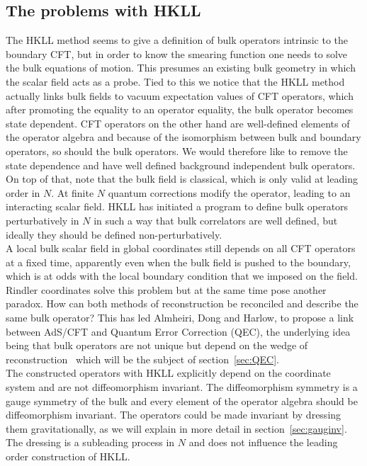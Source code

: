 \documentclass{PoS}
\begin{document}
\subsection{The problems with HKLL}
The HKLL method seems to give a definition of bulk operators intrinsic to the boundary CFT, but in order to know the smearing function one needs to solve the bulk equations of motion. This presumes an existing bulk geometry in which the scalar field acts as a probe. Tied to this we notice that the HKLL method actually links bulk fields to vacuum expectation values of CFT operators, which after promoting the equality to an operator equality, the bulk operator becomes state dependent.  CFT operators on the other hand are well-defined elements of the operator algebra and because of the isomorphism between bulk and boundary operators, so should the bulk operators. We would therefore like to remove the state dependence and have well defined background independent bulk operators. On top of that, note that the bulk field is classical, which is only valid at leading order in $N$. At finite $N$ quantum corrections modify the operator, leading to an interacting scalar field. HKLL has initiated a program to define bulk operators perturbatively in $N$ in such a way that bulk correlators are well defined, but ideally they should be defined non-perturbatively.\\

  A local bulk scalar field in global coordinates still depends on all CFT operators at a fixed time, apparently even when the bulk field is pushed to the boundary, which is at odds with the local boundary condition that we imposed on the field. Rindler coordinates solve this problem but at the same time pose another paradox. How can both methods of reconstruction be reconciled and describe the same bulk operator? This has led Almheiri, Dong and Harlow, to propose a link between AdS/CFT and Quantum Error Correction (QEC), the underlying idea being that bulk operators are not unique but depend on the wedge of reconstruction~\cite{Almheiri:2014lwa} which will be the subject of section~\ref{sec:QEC}.\\

The constructed operators with HKLL explicitly depend on the coordinate system and are not diffeomorphism invariant. The diffeomorphism symmetry is a gauge symmetry of the bulk and every element of the operator algebra should be diffeomorphism invariant. The operators could be made invariant by dressing them gravitationally, as we will explain in more detail in section~\ref{sec:gauginv}. The dressing is a subleading process in $N$ and does not influence the leading order construction of HKLL.\\
\end{document}
